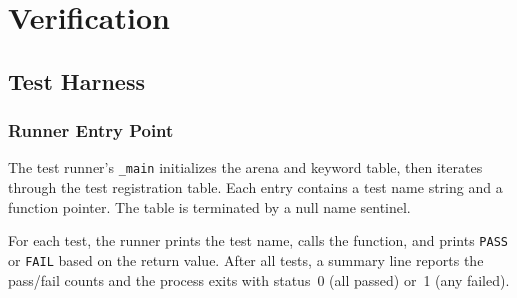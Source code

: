 \documentclass[11pt,a4paper,twoside,openright,DIV=15]{scrbook}
\theoremstyle{definition}
\theoremstyle{plain}
\theoremstyle{remark}
\begin{document}
\part{Verification}

%
%

\chapter{Test Harness}
\label{ch:test-harness}

\section{Runner Entry Point}

The test runner's \texttt{\_main} initializes the arena and keyword
table, then iterates through the test registration table.  Each
entry contains a test name string and a function pointer.  The table
is terminated by a null name sentinel.

For each test, the runner prints the test name, calls the function,
and prints \texttt{PASS} or \texttt{FAIL} based on the return value.
After all tests, a summary line reports the pass/fail counts and the
process exits with status~0 (all passed) or~1 (any failed).
\end{document}
